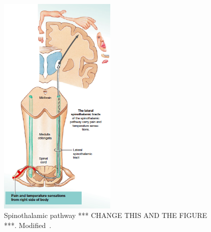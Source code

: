 \begin{figure}[H]
	\includegraphics[width=0.5\textwidth]{figures/pathways.png} 
	\caption{Spinothalamic pathway *** CHANGE THIS AND THE FIGURE ***. Modified~\cite{Martini2012}.}
	\label{fig:pathways}  
\end{figure}   



